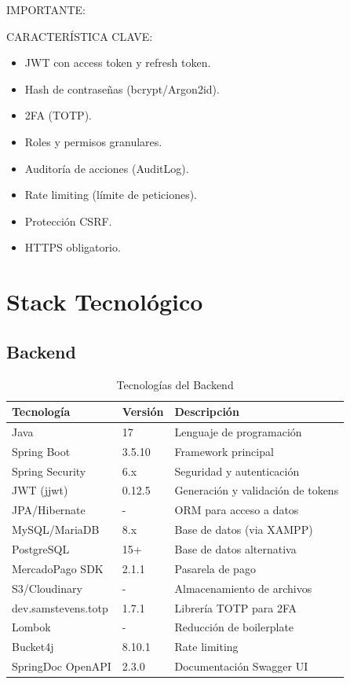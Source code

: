 \documentclass[12pt,a4paper,oneside]{book}
\begin{document}
\begin{alert}{IMPORTANTE:}
\begin{info}{CARACTERÍSTICA CLAVE:}
\begin{itemize}
    \item JWT con access token y refresh token.
    \item Hash de contraseñas (bcrypt/Argon2id).
    \item 2FA (TOTP).
    \item Roles y permisos granulares.
    \item Auditoría de acciones (AuditLog).
    \item Rate limiting (límite de peticiones).
    \item Protección CSRF.
    \item HTTPS obligatorio.
\end{itemize}

\chapter{Stack Tecnológico}
\label{cap:stack}

\section{Backend}
\label{sec:backend}

\begin{table}[ht]
    \centering
    \caption{Tecnologías del Backend}
    \begin{tabular}{@{}llp{8cm}@{}}
        \toprule
        \textbf{Tecnología} & \textbf{Versión} & \textbf{Descripción} \\
        \midrule
        Java & 17 & Lenguaje de programación \\
        Spring Boot & 3.5.10 & Framework principal \\
        Spring Security & 6.x & Seguridad y autenticación \\
        JWT (jjwt) & 0.12.5 & Generación y validación de tokens \\
        JPA/Hibernate & - & ORM para acceso a datos \\
        MySQL/MariaDB & 8.x & Base de datos (via XAMPP) \\
        PostgreSQL & 15+ & Base de datos alternativa \\
        MercadoPago SDK & 2.1.1 & Pasarela de pago \\
        S3/Cloudinary & - & Almacenamiento de archivos \\
        dev.samstevens.totp & 1.7.1 & Librería TOTP para 2FA \\
        Lombok & - & Reducción de boilerplate \\
        Bucket4j & 8.10.1 & Rate limiting \\
        SpringDoc OpenAPI & 2.3.0 & Documentación Swagger UI \\
        \bottomrule
    \end{tabular}
\end{table}


\end{info}
\end{alert}
\end{document}
